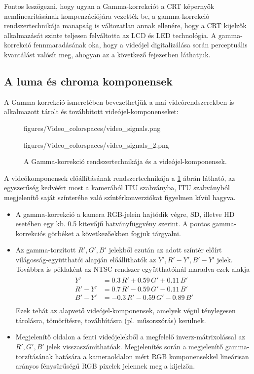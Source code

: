 \hspace{3mm}
Fontos leszögezni, hogy ugyan a Gamma-korrekciót a CRT képernyők nemlinearitásának kompenzációjára vezették be, a gamma-korrekció rendszertechnikája manapság is változatlan annak ellenére, hogy a CRT kijelzők alkalmazását szinte teljesen felváltotta az LCD és LED technológia.
A gamma-korrekció fennmaradásának oka, hogy a videójel digitalizálása során perceptuális kvantálást valósít meg, ahogyan az a következő fejezetben láthatjuk.

\subsection{A luma és chroma komponensek}
A Gamma-korrekció ismeretében bevezethetjük a mai videórendszerekben is alkalmazott tárolt és továbbított videójel-komponenseket:
\begin{figure}[]
	\centering
	\begin{overpic}[width = 0.53\columnwidth ]{figures/Video_colorspaces/video_signals.png}
	\end{overpic}
	\hspace{2mm}
	\begin{overpic}[width = 0.44\columnwidth ]{figures/Video_colorspaces/video_signals_2.png}
	\end{overpic}
	\caption{A Gamma-korrekció rendszertechnikája és a videójel-komponensek.}
	\label{Fig:gamma_system}  
\end{figure}
A videókomponensek előállításának rendszertechnikája a \ref{Fig:gamma_system} ábrán látható, az egyszerűség kedvéért most a kamerából ITU szabványba, ITU szabványból megjelenítő saját színterébe való színtérkonverziókat figyelmen kívül hagyva.
\begin{itemize}
\item A gamma-korrekció a kamera RGB-jelein hajtódik végre, SD, illetve HD esetében egy kb. 0.5 kitevőjű hatványfüggvény szerint.
A pontos gamma-korrekciós görbéket a következőekben fogjuk tárgyalni.
\item Az gamma-torzított $R',G',B'$ jelekből ezután az adott színtér előírt világosság-együtthatói alapján előállíthatók az $Y', R'-Y', B'-Y'$ jelek.
Továbbra is példaként az NTSC rendszer együtthatóinál maradva ezek alakja
\begin{align}
\begin{split}
Y' &= 0.3 \, R' + 0.59 \, G' + 0.11 \, B' \\
R'-Y' &= 0.7 \, R' - 0.59 \, G' - 0.11 \, B' \\
B'-Y' &= -0.3 \, R' - 0.59 \, G' - 0.89 \, B' \\
\end{split}
\end{align}
Ezek tehát az alapvető videójel-komponensek, amelyek végül ténylegesen tárolásra, tömörítésre, továbbításra (pl. műsorszórás) kerülnek.
\item Megjelenítő oldalon a fenti videójelekből a megfelelő inverz-mátrixolással az $R', G', B'$ jelek visszaszámíthatóak.
Megjelenítés során a megjelenítő gamma-torzításának hatására a kameraoldalon mért RGB komponensekkel lineárisan arányos fénysűrűségű RGB pixelek jelennek meg a kijelzőn.
\end{itemize}
